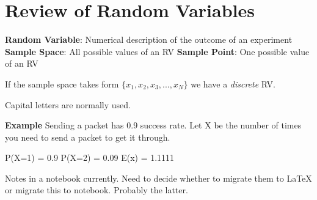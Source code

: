 \documentclass[12pt]{article}
\begin{document}
\section{Review of Random Variables}
\textbf{Random Variable}: Numerical description of the outcome of an experiment
\textbf{Sample Space}: All possible values of an RV
\textbf{Sample Point}: One possible value of an RV

If the sample space takes form $\{x_1,x_2,x_3,...,x_N\}$ we have a \textit{discrete} RV.

Capital letters are normally used.

\begin{framed}
\textbf{Example}
Sending a packet has 0.9 success rate.
Let X be the number of times you need to send a packet to get it through.

P(X=1) = 0.9
P(X=2) = 0.09
E(x) = 1.1111
\end{framed}

\begin{flushright}[Lecture on 1.2]\end{flushright}
Notes in a notebook currently. Need to decide whether to migrate them to LaTeX or migrate this to notebook. Probably the latter.
\end{document}

